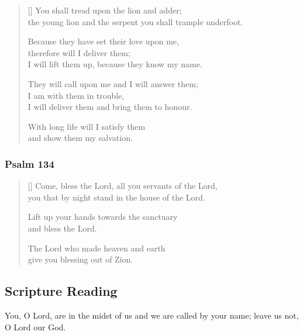 \documentclass[12pt]{report}
\begin{document}
\begin{verse}[\versewidth]
		You shall tread upon the lion and adder; \Pause\\
		the young lion and the serpent you shall trample underfoot.

		Because they have set their love upon me,\\
		\vin therefore will I deliver them; \Pause\\
		I will lift them up, because they know my name.

		They will call upon me and I will answer them; \Pause\\
		I am with them in trouble,\\
		\vin I will deliver them and bring them to honour.

		With long life will I satisfy them \Pause\\
		and show them my salvation.
	\end{verse}

	\subsubsection*{Psalm 134}

	\begin{verse}[\versewidth]
		Come, bless the Lord, all you servants of the Lord, \Pause\\
		you that by night stand in the house of the Lord.

		Lift up your hands towards the sanctuary \Pause\\
		and bless the Lord.

		The Lord who made heaven and earth \Pause\\
		give you blessing out of Zion.
	\end{verse}


	\glorybe

	\subsection*{Scripture Reading}


	\begin{scripture}[Jeremiah 14.9]
		You, O Lord, are in the midst of us and we are called by your name; leave us not, O Lord our God.
	\end{scripture}
\end{document}
